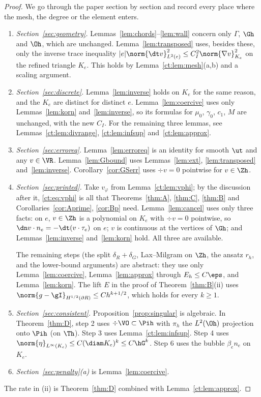 \begin{proof}
We go through the paper section by section and record every place where the mesh, the degree or the element enters.
\begin{enumerate}
\item \emph{Section~\ref{sec:geometry}.} Lemmas~\ref{lem:chords}--\ref{lem:wall} concern only $\Gamma$, $\Gh$ and $\Oh$, which are unchanged. Lemma~\ref{lem:transposed} uses, besides these, only the inverse trace inequality $|e|\norm{\dt v}_{L^2(e)}^2\le C_I^2\norm{\nabla v}^2_{K_e}$ on the refined triangle $K_e$. This holds by Lemma~\ref{ct:lem:mesh}(a,b) and a scaling argument.
\item \emph{Section~\ref{sec:discrete}.} Lemma~\ref{lem:inverse} holds on $K_e$ for the same reason, and the $K_e$ are distinct for distinct $e$. Lemma~\ref{lem:coercive} uses only Lemmas~\ref{lem:korn} and~\ref{lem:inverse}, so its formulas for $\mu_0$, $\gamma_0$, $c_1$, $M$ are unchanged, with the new $C_I$. For the remaining three lemmas, see Lemmas~\ref{ct:lem:divrange}, \ref{ct:lem:infsup} and~\ref{ct:lem:approx}.
\item \emph{Section~\ref{sec:erroreq}.} Lemma~\ref{lem:erroreq} is an identity for smooth $\ut$ and any $v\in\VR$. Lemma~\ref{lem:Gbound} uses Lemmas~\ref{lem:ext}, \ref{lem:transposed} and~\ref{lem:inverse}. Corollary~\ref{cor:GSerr} uses $\div v=0$ pointwise for $v\in\Zh$.
\item \emph{Section~\ref{sec:printed}.} Take $v_\varphi$ from Lemma~\ref{ct:lem:vphi}; by the discussion after it, \eqref{ct:eq:vphi} is all that Theorems~\ref{thm:A}, \ref{thm:C}, \ref{thm:B} and Corollaries~\ref{cor:Aprime}, \ref{cor:Bp} need. Lemma~\ref{lem:cancel} uses only three facts: on $e$, $v\in\Zh$ is a polynomial on $K_e$ with $\div v=0$ pointwise, so $\dn v\cdot n_e=-\dt(v\cdot\tau_e)$ on $e$; $v$ is continuous at the vertices of $\Gh$; and Lemmas~\ref{lem:inverse} and~\ref{lem:korn} hold. All three are available.

The remaining steps (the split $\delta_R+\delta_G$, Lax--Milgram on $\Zh$, the ansatz $r_h$, and the lower-bound arguments) are abstract: they use only Lemma~\ref{lem:coercive}, Lemma~\ref{lem:approx} through $E_h\le C\eps$, and Lemma~\ref{lem:korn}. The lift $E$ in the proof of Theorem~\ref{thm:B}(ii) uses $\norm{g-\gI}_{H^{1/2}(\partial R)}\le Ch^{k+1/2}$, which holds for every $k\ge1$.
\item \emph{Section~\ref{sec:consistent}.} Proposition~\ref{prop:singular} is algebraic. In Theorem~\ref{thm:D}, step 2 uses $\div\VO\subset\Pih$ with $\pi_h$ the $L^2(\Oh)$ projection onto $\Pih$ (on $\Th$). Step 3 uses Lemma~\ref{ct:lem:infsup}. Step 4 uses $\norm{\eta}_{L^\infty(K_e)}\le C(\diam K_e)^k\le C\hG^k$. Step 6 uses the bubble $\beta_en_e$ on $K_e$.
\item \emph{Section~\ref{sec:penalty}(a)} is Lemma~\ref{lem:coercive}.
\end{enumerate}
The rate in (ii) is Theorem~\ref{thm:D} combined with Lemma~\ref{ct:lem:approx}.
\end{proof}

